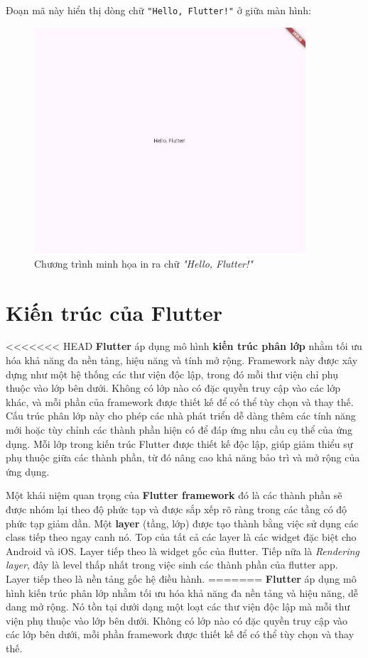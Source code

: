 \documentclass[../DoAn.tex]{subfiles}
\numberwithin{figure}{chapter}
\begin{document}
Đoạn mã này hiển thị dòng chữ \texttt{"Hello, Flutter!"} ở giữa màn hình:
\begin{figure}[H]
    \centering
    \includegraphics[width=0.9\textwidth]{Hinhve/helloflutter.png}
    \caption{Chương trình minh họa in ra chữ \textit{"Hello, Flutter!"}}
    \label{fig:flutterimg}
\end{figure}

\section{Kiến trúc của Flutter}
<<<<<<< HEAD
\textbf{Flutter} áp dụng mô hình \textbf{kiến trúc phân lớp} nhằm tối ưu hóa khả năng đa nền tảng, hiệu năng và tính mở rộng. Framework này được xây dựng như một hệ thống các thư viện độc lập, trong đó mỗi thư viện chỉ phụ thuộc vào lớp bên dưới. Không có lớp nào có đặc quyền truy cập vào các lớp khác, và mỗi phần của framework được thiết kế để có thể tùy chọn và thay thế. Cấu trúc phân lớp này cho phép các nhà phát triển dễ dàng thêm các tính năng mới hoặc tùy chỉnh các thành phần hiện có để đáp ứng nhu cầu cụ thể của ứng dụng. Mỗi lớp trong kiến trúc Flutter được thiết kế độc lập, giúp giảm thiểu sự phụ thuộc giữa các thành phần, từ đó nâng cao khả năng bảo trì và mở rộng của ứng dụng.

Một khái niệm quan trọng của \textbf{Flutter framework} đó là các thành phần sẽ được nhóm lại theo độ phức tạp và được sắp xếp rõ ràng trong các tầng có độ phức tạp giảm dần. Một \textbf{layer} (tầng, lớp) được tạo thành bằng việc sử dụng các class tiếp theo ngay canh nó. Top của tất cả các layer là các widget đặc biệt cho Android và iOS. Layer tiếp theo là widget gốc của flutter. Tiếp nữa là \textit{Rendering layer}, đây là level thấp nhất trong việc sinh các thành phần của flutter app. Layer tiếp theo là nền tảng gốc hệ điều hành.
=======
\textbf{Flutter} áp dụng mô hình kiến trúc phân lớp nhằm tối ưu hóa khả năng đa nền tảng và hiệu năng, dễ dang mở rộng. Nó tồn tại dưới dạng một loạt các thư viện độc lập mà mỗi thư viện phụ thuộc vào lớp bên dưới. Không có lớp nào có đặc quyền truy cập vào các lớp bên dưới, mỗi phần framework được thiết kế để có thể tùy chọn và thay thế.
\end{document}
